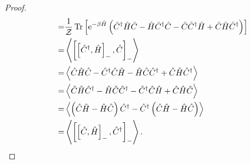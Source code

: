 \begin{proof}
\begin{align}
=&\frac{1}{\mathcal{Z}} \operatorname{Tr}\left[\mathrm{e}^{-\beta \hat{H}}\left(\hat{C}^{\dagger} \hat{H} \hat{C}-\hat{H} \hat{C}^{\dagger} \hat{C}-\hat{C} \hat{C}^{\dagger} \hat{H}+\hat{C} \hat{H} \hat{C}^{\dagger}\right)\right]\nonumber\\
=&\left\langle\left[\left[\hat{C}^{\dagger}, \hat{H}\right]_{-}, \hat{C}\right]_{-}\right\rangle \nonumber\\
=&\left\langle\hat{C} \hat{H} \hat{C}-\hat{C}^{\dagger} \hat{C} \hat{H}-\hat{H} \hat{C} \hat{C}^{\dagger}+\hat{C} \hat{H} \hat{C}^{\dagger}\right\rangle\nonumber \\
=&\left\langle\hat{C} \hat{H} \hat{C}^{\dagger}-\hat{H} \hat{C} \hat{C}^{\dagger}-\hat{C}^{\dagger} \hat{C} \hat{H}+\hat{C} \hat{H} \hat{C}\right\rangle \nonumber\\
=&\left\langle\left(\hat{C} \hat{H}-\hat{H} \hat{C}\right) \hat{C}^{\dagger}-\hat{C}^{\dagger}\left(\hat{C} \hat{H}-\hat{H} \hat{C}\right)\right\rangle \nonumber\\
=&\left\langle\left[\left[\hat{C}, \hat{H}\right]_{-}, \hat{C}^{\dagger}\right]_{-}\right\rangle.
\end{align}
\end{proof}

